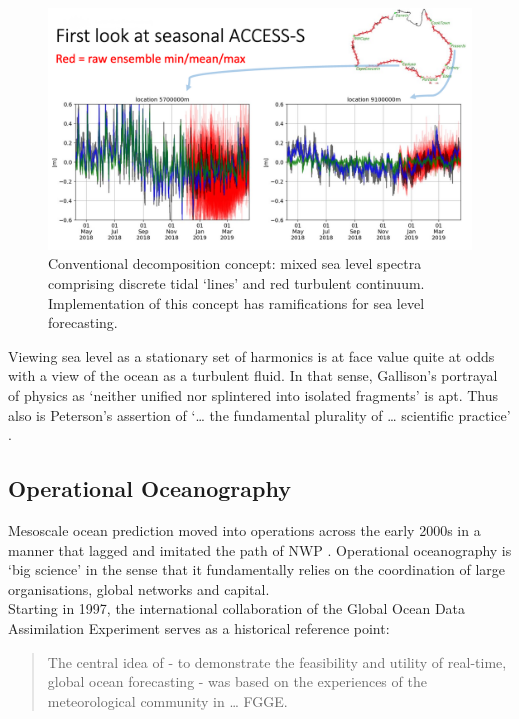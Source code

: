 \begin{figure}[h]
\begin{center}
\includegraphics[width=120mm]{figures/images/spectra_cartoon_1.png}
\caption{Conventional decomposition concept: mixed sea level spectra comprising discrete tidal `lines' and red turbulent continuum.  Implementation of this concept has ramifications for sea level forecasting.}
\label{fig:SPECTRA_CARTOON}
\end{center}
\end{figure}


Viewing sea level as a stationary set of harmonics is at face value quite at odds with a view of the ocean as a turbulent fluid.   In that sense, Gallison's portrayal of physics as `neither unified nor splintered into isolated fragments' \citep[pp 782]{Galison:1987wh} is apt.  Thus also is Peterson's assertion of `\dots{} the fundamental plurality of \dots{} scientific practice' \cite{Petersen:2012tr}. 
\newpage
\subsection{Operational Oceanography}
\label{S:operational_oceanography}

Mesoscale ocean prediction moved into operations across the early 2000s in a manner that lagged and imitated the path of NWP \citep{Harper:2008ub}. Operational oceanography is `big science' \citep{Petersen:2012tr} in the sense that it fundamentally relies on the coordination of large organisations, global networks and capital. \\
Starting in 1997, the international collaboration of the Global Ocean Data Assimilation Experiment \GODAE{} serves as a historical reference point:

\begin{quote}
The central idea of \GODAE{} - to demonstrate the feasibility and utility of real-time, global ocean forecasting - was based on the experiences of the meteorological community in \dots{} FGGE. \citep{Bell:2009uv}
\end{quote}


